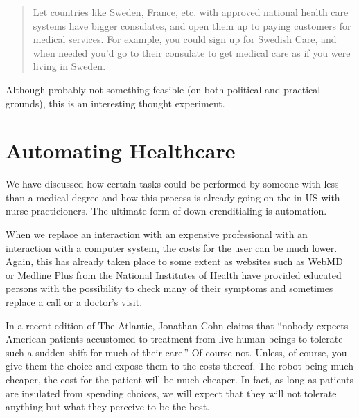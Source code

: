 \begin{quote}
Let countries like Sweden, France, etc. with approved national health care
systems have bigger consulates, and open them up to paying customers for
medical services. For example, you could sign up for Swedish Care, and when
needed you’d go to their consulate to get medical care as if you were living in
Sweden.
\end{quote}

Although probably not something feasible (on both political and practical
grounds), this is an interesting thought experiment.

\section{Automating Healthcare}

We have discussed how certain tasks could be performed by someone with less
than a medical degree and how this process is already going on the in US with
nurse-practicioners. The ultimate form of down-crenditialing is automation.

When we replace an interaction with an expensive professional with an
interaction with a computer system, the costs for the user can be much lower.
Again, this has already taken place to some extent as websites such as WebMD or
Medline Plus from the National Institutes of Health have provided educated
persons with the possibility to check many of their symptoms and sometimes
replace a call or a doctor's visit.

In a recent edition of The Atlantic, Jonathan Cohn claims that ``nobody expects
American patients accustomed to treatment from live human beings to tolerate
such a sudden shift for much of their care.'' Of course not. Unless,
of course, you give them the choice and expose them to the costs thereof. The
robot being much cheaper, the cost for the patient will be much cheaper. In
fact, as long as patients are insulated from spending choices, we will expect
that they will not tolerate anything but what they perceive to be the best.

